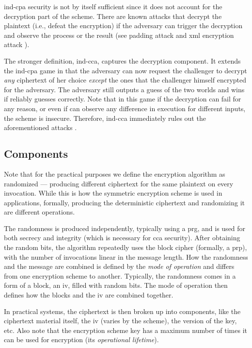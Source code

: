 			\acrshort{ind-cpa} security is not by itself sufficient since it does not account for the decryption part of the scheme.
			There are known attacks that decrypt the plaintext (i.e., defeat the encryption) if the adversary can trigger the decryption and observe the process or the result (see padding attack \cite{padding-attack} and \acrshort{xml} encryption attack \cite{xml-break-encryption}).

			The stronger definition, \acrfull{ind-cca}, captures the decryption component.
			It extends the \acrshort{ind-cpa} game in that the adversary can now request the challenger to decrypt \emph{any} ciphertext of her choice \emph{except} the ones that the challenger himself encrypted for the adversary.
			The adversary still outputs a guess of the two worlds and wins if reliably guesses correctly.
			Note that in this game if the decryption can fail for any reason, or even if \adversary{} can observe any difference in execution for different inputs, the scheme is insecure.
			Therefore, \acrshort{ind-cca} immediately rules out the aforementioned attacks \cite{padding-attack,xml-break-encryption}.

		\subsection{Components}

			Note that for the practical purposes we define the encryption algorithm as randomized --- producing different ciphertext for the same plaintext on every invocation.
			While this is how the symmetric encryption scheme is used in applications, formally, producing the deterministic ciphertext and randomizing it are different operations.

			The randomness is produced independently, typically using a \acrfull{prg}, and is used for both secrecy and integrity (which is necessary for \acrshort{cca} security).
			After obtaining the random bits, the algorithm repeatedly uses the block cipher (formally, a \acrfull{prp}), with the number of invocations linear in the message length.
			How the randomness and the message are combined is defined by the \emph{mode of operation} and differs from one encryption scheme to another.
			Typically, the randomness comes in a form of a block, an \acrfull{iv}, filled with random bits.
			The mode of operation then defines how the blocks and the \acrshort{iv} are combined together.

			In practical systems, the ciphertext is then broken up into components, like the ciphertext material itself, the \acrshort{iv} (varies by the scheme), the version of the key, etc.
			Also note that the encryption scheme key has a maximum number of times it can be used for encryption (its \emph{operational lifetime}).

